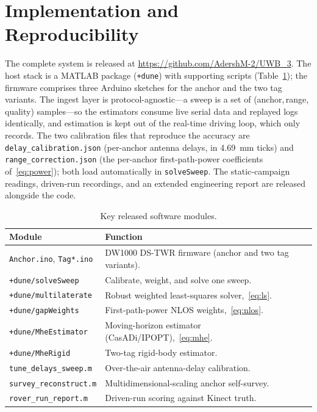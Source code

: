 \section{Implementation and Reproducibility}
\label{sec:impl}

The complete system is released at
\url{https://github.com/AdershM-2/UWB_3}. The host stack is a MATLAB
package (\texttt{+dune}) with supporting scripts
(Table~\ref{tab:sw}); the firmware comprises three Arduino sketches for
the anchor and the two tag variants. The ingest layer is
protocol-agnostic---a sweep is a set of (anchor,\,range,\,quality)
samples---so the estimators consume live serial data and replayed logs
identically, and estimation is kept out of the real-time driving loop,
which only records. The two calibration files that reproduce the accuracy
are \texttt{delay\_calibration.json} (per-anchor antenna delays, in
\SI{4.69}{\milli\meter} ticks) and \texttt{range\_correction.json}
(the per-anchor first-path-power coefficients of~\eqref{eq:power}); both
load automatically in \texttt{solveSweep}. The static-campaign readings,
driven-run recordings, and an extended engineering report are released
alongside the code.

\begin{table}[t]
  \centering
  \caption{Key released software modules.}
  \label{tab:sw}
  \footnotesize
  \begin{tabular}{@{}lp{4.7cm}@{}}
    \toprule
    \textbf{Module} & \textbf{Function}\\
    \midrule
    \texttt{Anchor.ino}, \texttt{Tag*.ino} & DW1000 DS-TWR firmware
      (anchor and two tag variants).\\
    \texttt{+dune/solveSweep}       & Calibrate, weight, and solve one sweep.\\
    \texttt{+dune/multilaterate}    & Robust weighted least-squares solver,~\eqref{eq:ls}.\\
    \texttt{+dune/gapWeights}       & First-path-power NLOS weights,~\eqref{eq:nlos}.\\
    \texttt{+dune/MheEstimator}     & Moving-horizon estimator (CasADi/IPOPT),~\eqref{eq:mhe}.\\
    \texttt{+dune/MheRigid}         & Two-tag rigid-body estimator.\\
    \texttt{tune\_delays\_sweep.m}  & Over-the-air antenna-delay calibration.\\
    \texttt{survey\_reconstruct.m}  & Multidimensional-scaling anchor self-survey.\\
    \texttt{rover\_run\_report.m}   & Driven-run scoring against Kinect truth.\\
    \bottomrule
  \end{tabular}
\end{table}
